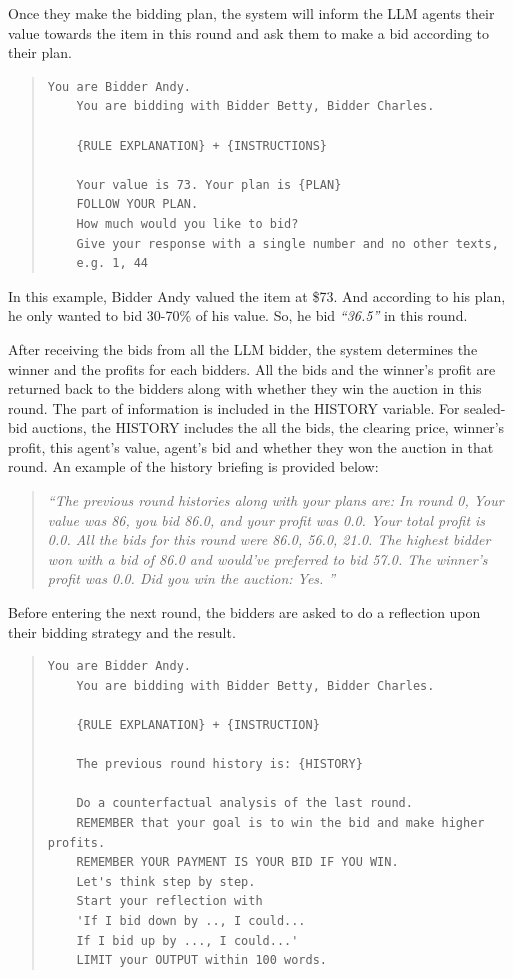 \documentclass{article} %
\begin{document}
Once they make the bidding plan, the system will inform the LLM agents their value towards the item in this round and ask them to make a bid according to their plan.
\begin{quote}
\begin{lstlisting}[basicstyle=\ttfamily]
    You are Bidder Andy.            
    You are bidding with Bidder Betty, Bidder Charles.     
    
    {RULE EXPLANATION} + {INSTRUCTIONS}

    Your value is 73. Your plan is {PLAN}
    FOLLOW YOUR PLAN.
    How much would you like to bid?
    Give your response with a single number and no other texts, 
    e.g. 1, 44
\end{lstlisting}
\end{quote}

In this example, Bidder Andy valued the item at \$73. And according to his plan, he only wanted to bid 30-70\% of his value. So, he bid \textit{``36.5''} in this round.

After receiving the bids from all the LLM bidder, the system determines the winner and the profits for each bidders. All the bids and the winner's profit are returned back to the bidders along with whether they win the auction in this round. The part of information is included in the HISTORY variable. For sealed-bid auctions, the HISTORY includes the all the bids, the clearing price, winner's profit, this agent's value, agent's bid and whether they won the auction in that round. An example of the history briefing is provided below:
\begin{quote}
   \textit{ ``The previous round histories along with your plans are: 
   In round 0, Your value was 86, you bid 86.0, and your profit was 0.0. Your total profit is 0.0. All the bids for this round were 86.0, 56.0, 21.0. The highest bidder won with a bid of 86.0 and would've preferred to bid 57.0. The winner's profit was 0.0. Did you win the auction: Yes. ''}
\end{quote}

Before entering the next round, the bidders are asked to do a reflection upon their bidding strategy and the result.
\begin{quote}
\begin{lstlisting}[basicstyle=\ttfamily]
    You are Bidder Andy.            
    You are bidding with Bidder Betty, Bidder Charles.     
    
    {RULE EXPLANATION} + {INSTRUCTION} 

    The previous round history is: {HISTORY}
    
    Do a counterfactual analysis of the last round. 
    REMEMBER that your goal is to win the bid and make higher profits. 
    REMEMBER YOUR PAYMENT IS YOUR BID IF YOU WIN. 
    Let's think step by step. 
    Start your reflection with 
    'If I bid down by .., I could... 
    If I bid up by ..., I could...' 
    LIMIT your OUTPUT within 100 words. 
\end{lstlisting}
\end{quote}
\end{document}
